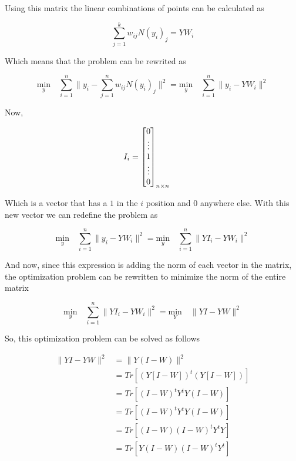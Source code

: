 \documentclass[12pt,journal]{IEEEtran}
\begin{document}
    Using this matrix the linear combinations of points can be calculated as

    \begin{equation*}
        \sum_{j=1}^k w_{ij} N(y_i)_j = Y W_i
    \end{equation*}

    Which means that the problem can be rewrited as

    \begin{equation*}
            \underset{y}{\text{min}} \quad \sum_{i=1}^n \lVert y_i - \sum_{j=1}^n w_{ij} N(y_i)_j \rVert^2
            =
            \underset{y}{\text{min}} \quad \sum_{i=1}^n \lVert y_i - Y W_i \rVert^2
    \end{equation*}

    Now,

    \[
        I_i =
        \begin{bmatrix}
            0 \\
            \vdots \\
            1 \\
            \vdots \\
            0 \\
        \end{bmatrix}_{n \times n}
        \hspace{0.5cm}
    \]

    Which is a vector that has a $1$ in the $i$ position and $0$ anywhere else.
    With this new vector we can redefine the problem as

    \begin{equation*}
            \underset{y}{\text{min}} \quad \sum_{i=1}^n \lVert y_i - Y W_i \rVert^2
            =
            \underset{y}{\text{min}} \quad \sum_{i=1}^n \lVert YI_i - Y W_i \rVert^2
    \end{equation*}

    And now, since this expression is adding the norm of each vector in the
    matrix, the optimization problem can be rewritten to minimize the norm of
    the entire matrix

    \begin{equation*}
            \underset{y}{\text{min}} \quad \sum_{i=1}^n \lVert YI_i - Y W_i \rVert^2
            =
            \underset{Y}{\text{min}} \quad \lVert YI - Y W \rVert^2
    \end{equation*}

    So, this optimization problem can be solved as follows

    \begin{equation*}
        \begin{aligned}
            \lVert Y I - Y W \rVert^2 &= \lVert Y (I - W) \rVert^2\\
            &= Tr[(Y [I-W])^t (Y [I-W])]\\
            &= Tr[(I-W)^t Y^t Y (I-W)]\\
            &= Tr[(I-W)^t Y^t Y (I-W)]\\
            &= Tr[(I-W) (I-W)^t Y^t Y]\\
            &= Tr[Y (I-W) (I-W)^t Y^t]\\
        \end{aligned}
    \end{equation*}
\end{document}
